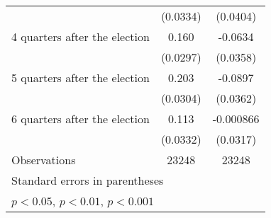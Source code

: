 \begin{table}[htbp]
\begin{tabular}{l*{2}{c}}
                    &    (0.0334)         &    (0.0404)         \\
[1em]
 4 quarters after the election&       0.160\sym{***}&     -0.0634         \\
                    &    (0.0297)         &    (0.0358)         \\
[1em]
 5 quarters after the election&       0.203\sym{***}&     -0.0897\sym{*}  \\
                    &    (0.0304)         &    (0.0362)         \\
[1em]
 6 quarters after the election&       0.113\sym{***}&   -0.000866         \\
                    &    (0.0332)         &    (0.0317)         \\
\hline
Observations        &       23248         &       23248         \\
\hline\hline
\multicolumn{3}{l}{\footnotesize Standard errors in parentheses}\\
\multicolumn{3}{l}{\footnotesize \sym{*} \(p<0.05\), \sym{**} \(p<0.01\), \sym{***} \(p<0.001\)}\\
\end{tabular}
\end{table}
